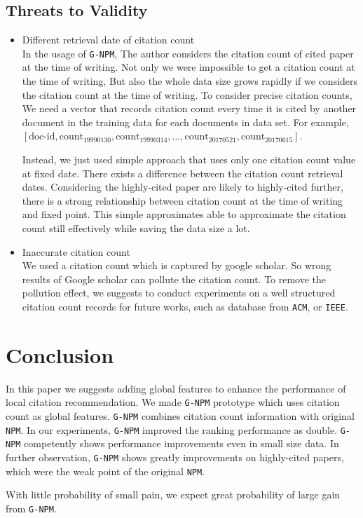 \documentclass{llncs}
\newcommand{\name}{\texttt{G-NPM}\xspace}
\newcommand{\npm}{\texttt{NPM}\xspace}
\begin{document}
\subsection{Threats to Validity}

\begin{itemize}
\item Different retrieval date of citation count\\
In the usage of \name, The author considers the citation count of cited paper at the time of writing. Not only we were impossible to get a citation count at the time of writing, But also the whole data size grows rapidly if we considers the citation count at the time of writing. To consider precise citation counts, We need a vector that records citation count every time it is cited by another document in the training data for each documents in data set. For example, $[\text{doc-id}, \text{count}_{19990130}, \text{count}_{19990314}, \dots, \text{count}_{20170521}, \text{count}_{20170615}]$.

Instead, we just used simple approach that uses only one citation count value at fixed date. There exists a difference between the citation count retrieval dates. Considering the highly-cited paper are likely to highly-cited further, there is a strong relationship between citation count at the time of writing and fixed point. This simple approximates able to approximate the citation count still effectively while saving the data size a lot.\\

\item Inaccurate citation count\\
We used a citation count which is captured by google scholar. So wrong results of Google scholar can pollute the citation count. To remove the pollution effect, we suggests to conduct experiments on a well structured citation count records for future works, such as database from \texttt{ACM}, or \texttt{IEEE}.
\end{itemize}



\section{Conclusion}
\label{sec:Conclusion}

In this paper we suggests adding global features to enhance the performance of local citation recommendation. We made \name prototype which uses citation count as global features. \name combines citation count information with original \npm. In our experiments, \name improved the ranking performance as double. \name competently shows performance improvements even in small size data. In further observation, \name shows greatly improvements on highly-cited papers, which were the weak point of the original \npm.

With little probability of small pain, we expect great probability of large gain from \name.





\end{document}
